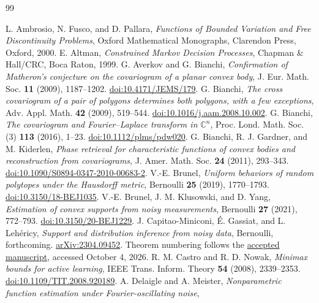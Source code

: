 \begin{thebibliography}{99}
\raggedright
{}
L. Ambrosio, N. Fusco, and D. Pallara, \emph{Functions of Bounded
Variation and Free Discontinuity Problems}, Oxford Mathematical
Monographs, Clarendon Press, Oxford, 2000.
E. Altman, \emph{Constrained Markov Decision Processes},
Chapman \& Hall/CRC, Boca Raton, 1999.
G. Averkov and G. Bianchi,
\emph{Confirmation of Matheron's conjecture on the covariogram of a planar convex body},
J. Eur. Math. Soc. \textbf{11} (2009), 1187--1202.
\href{https://doi.org/10.4171/JEMS/179}{doi:10.4171/JEMS/179}.
G. Bianchi, \emph{The cross covariogram of a pair of polygons determines both
polygons, with a few exceptions}, Adv. Appl. Math. \textbf{42} (2009), 519--544.
\href{https://doi.org/10.1016/j.aam.2008.10.002}{doi:10.1016/j.aam.2008.10.002}.
G. Bianchi, \emph{The covariogram and Fourier--Laplace transform in $\mathbb C^n$},
Proc. Lond. Math. Soc. (3) \textbf{113} (2016), 1--23.
\href{https://doi.org/10.1112/plms/pdw020}{doi:10.1112/plms/pdw020}.
G. Bianchi, R. J. Gardner, and M. Kiderlen,
\emph{Phase retrieval for characteristic functions of convex bodies and
reconstruction from covariograms}, J. Amer. Math. Soc. \textbf{24} (2011), 293--343.
\href{https://doi.org/10.1090/S0894-0347-2010-00683-2}
{doi:10.1090/S0894-0347-2010-00683-2}.
V.-E. Brunel, \emph{Uniform behaviors of random polytopes under the
Hausdorff metric}, Bernoulli \textbf{25} (2019), 1770--1793.
\href{https://doi.org/10.3150/18-BEJ1035}{doi:10.3150/18-BEJ1035}.
V.-E. Brunel, J. M. Klusowski, and D. Yang,
\emph{Estimation of convex supports from noisy measurements},
Bernoulli \textbf{27} (2021), 772--793.
\href{https://doi.org/10.3150/20-BEJ1229}{doi:10.3150/20-BEJ1229}.
J. Capitao-Miniconi, \'E. Gassiat, and L. Leh\'ericy,
\emph{Support and distribution inference from noisy data}, Bernoulli, forthcoming.
\href{https://arxiv.org/abs/2304.09452}{arXiv:2304.09452}.
Theorem numbering follows the
\href{https://www.e-publications.org/ims/submission/BEJ/user/submissionFile/68730?confirm=a078ae36}
{accepted manuscript}, accessed October 4, 2026.
R. M. Castro and R. D. Nowak, \emph{Minimax bounds for active learning},
IEEE Trans. Inform. Theory \textbf{54} (2008), 2339--2353.
\href{https://doi.org/10.1109/TIT.2008.920189}{doi:10.1109/TIT.2008.920189}.
A. Delaigle and A. Meister,
\emph{Nonparametric function estimation under Fourier-oscillating noise},

\end{thebibliography}
